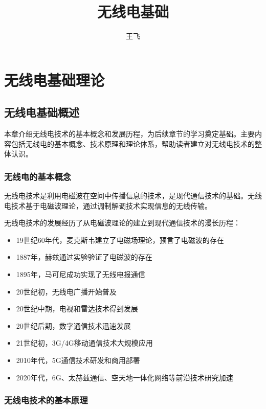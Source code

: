 \documentclass[12pt,UTF8]{ctexbook}
\title{\heiti\zihao{0} 无线电基础}
\author{王飞}
\date{}
\begin{document}
\maketitle
\tableofcontents
\listoffigures
\listoftables

\frontmatter

\mainmatter

\part{无线电基础理论}

\chapter{无线电基础概述}

本章介绍无线电技术的基本概念和发展历程，为后续章节的学习奠定基础。主要内容包括无线电的基本概念、技术原理和理论体系，帮助读者建立对无线电技术的整体认识。

\section{无线电的基本概念}

无线电技术是利用电磁波在空间中传播信息的技术，是现代通信技术的基础。无线电技术基于电磁波理论，通过调制解调技术实现信息的无线传输。

无线电技术的发展经历了从电磁波理论的建立到现代通信技术的漫长历程：
\begin{itemize}[leftmargin=3.5em]
    \item 19世纪60年代，麦克斯韦建立了电磁场理论，预言了电磁波的存在
    \item 1887年，赫兹通过实验验证了电磁波的存在
    \item 1895年，马可尼成功实现了无线电报通信
    \item 20世纪初，无线电广播开始普及
    \item 20世纪中期，电视和雷达技术得到发展
    \item 20世纪后期，数字通信技术迅速发展
    \item 21世纪初，3G/4G移动通信技术大规模应用
    \item 2010年代，5G通信技术研发和商用部署
    \item 2020年代，6G、太赫兹通信、空天地一体化网络等前沿技术研究加速
\end{itemize}

\section{无线电技术的基本原理}
\end{document}
